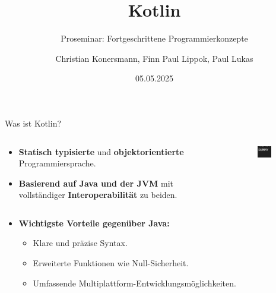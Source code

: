 \documentclass{beamer}
\title{Kotlin}
\subtitle{Proseminar: Fortgeschrittene Programmierkonzepte}
\author[C. Konersmann, F. Lippok, P. Lukas]{
  Christian Konersmann, Finn Paul Lippok, Paul Lukas
}
\date{05.05.2025}
\begin{document}
\frame{\titlepage}

\begin{frame}{Was ist Kotlin?}
  \begin{columns}
    \begin{column}{0.7\textwidth}
      \begin{itemize}
        \item \textbf{Statisch typisierte} und \textbf{objektorientierte} Programmiersprache.
        \item \textbf{Basierend auf Java und der JVM} mit vollständiger \textbf{Interoperabilität} zu beiden.
      \end{itemize}
    \end{column}
    \begin{column}{0.3\textwidth}
      \begin{figure}
        \centering
        \includegraphics[width=0.6\textwidth]{Kotlin Full Color Logo Mark RGB.png}
      \end{figure}
    \end{column}
  \end{columns}
  \pause\vspace{0.5cm}
  \begin{itemize}
    \item \textbf{Wichtigste Vorteile gegenüber Java:} %
    \begin{itemize} %
      \item Klare und präzise Syntax.
      \item Erweiterte Funktionen wie Null-Sicherheit.
      \item Umfassende Multiplattform-Entwicklungsmöglichkeiten.
    \end{itemize}
  \end{itemize}
\end{frame}
\end{document}
